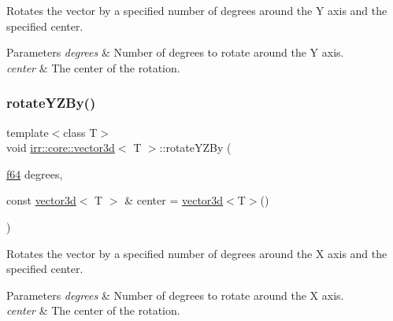 Rotates the vector by a specified number of degrees around the Y axis and the specified center. 


\begin{DoxyParams}{Parameters}
{\em degrees} & Number of degrees to rotate around the Y axis. \\
\hline
{\em center} & The center of the rotation. \\
\hline
\end{DoxyParams}
\mbox{\label{classirr_1_1core_1_1vector3d_aaa048312f75f152861479cb48e2ddfe4}} 
\subsubsection{\texorpdfstring{rotate\+Y\+Z\+By()}{rotateYZBy()}\hspace{0.1cm}{\footnotesize\ttfamily [1/2]}}
{\footnotesize\ttfamily template$<$class T$>$ \\
void \hyperlink{classirr_1_1core_1_1vector3d}{irr\+::core\+::vector3d}$<$ T $>$\+::rotate\+Y\+Z\+By (\begin{DoxyParamCaption}\item[{\hyperlink{namespaceirr_a1325b02603ad449f92c68fc640af9b28}{f64}}]{degrees,  }\item[{const \hyperlink{classirr_1_1core_1_1vector3d}{vector3d}$<$ T $>$ \&}]{center = {\ttfamily \hyperlink{classirr_1_1core_1_1vector3d}{vector3d}$<$T$>$()} }\end{DoxyParamCaption})\hspace{0.3cm}{\ttfamily [inline]}}



Rotates the vector by a specified number of degrees around the X axis and the specified center. 


\begin{DoxyParams}{Parameters}
{\em degrees} & Number of degrees to rotate around the X axis. \\
\hline
{\em center} & The center of the rotation. \\
\hline
\end{DoxyParams}
\mbox{\label{classirr_1_1core_1_1vector3d_aaa048312f75f152861479cb48e2ddfe4}} 
